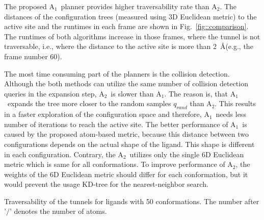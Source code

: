 \documentclass[usletter, 10pt, conference]{ieeeconf} %
\def\qrand{q_{rand}}
\def\RA{A$_{1}$}
\def\RB{A$_{2}$}
\begin{document}
The proposed \RA\ planner provides higher traversability rate than \RB.
The distances of the configuration trees (measured using 3D Euclidean metric) to the active site and the runtimes in each frame
are shown in Fig.~\ref{fig::comparison}.
The runtimes of both algorithms increase in those frames, where the tunnel is not traversable, i.e., where the distance
to the active site is more than 2~\AA (e.g., the frame number 60).



The most time consuming part of the planners is the collision detection. 
Although the both methods can utilize the same number of collision detection queries in the expansion step, \RB\ is slower than \RA.
The reason is, that \RA\ expands the tree more closer to the random samples $\qrand$ than \RB.
This results in a faster exploration of the configuration space and therefore, \RA\ needs less number of iterations to reach the active site.
The better performance of \RA\ is caused by the proposed atom-based metric, because this distance between two configurations depends on the actual shape of the ligand.
This shape is different in each configuration.
Contrary, the \RB\ utilizes only the single 6D Euclidean metric which is same for all conformations.
To improve performance of \RB, the weights of the 6D Euclidean metric should differ for each conformation, but it would
prevent the usage KD-tree for the nearest-neighbor search.




\begin{table}
\centering
\caption{\label{tab::main}
    Traversability of the tunnels for ligands with 50 conformations. 
    The number after '$/$' denotes the number of atoms.
}
\small
\renewcommand{\tabcolsep}{3pt}
{\small

}
\end{table}
\end{document}
